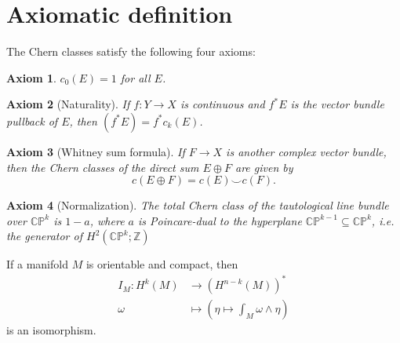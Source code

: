 \documentclass[11pt]{homework}
\theoremstyle{indented}
\newtheorem{axiom}{Axiom}
\begin{document}
\section{Axiomatic definition}
\begin{definition}
    The Chern classes satisfy the following four axioms:
        \begin{axiom} $c_{0}(E)=1$ for all $E$.\end{axiom}

        \begin{axiom}[Naturality] If $f : Y \to X$ is continuous and $f^*E$ is the vector bundle pullback of $E$, then $(f^{*}E)=f^{*}c_{k}(E)$.\end{axiom}

        \begin{axiom}[Whitney sum formula]
            \label{axm:whitney_sum}
            If $F\to X$ is another complex vector bundle, then the Chern classes of the direct sum $E\oplus F$ are given by
            \begin{equation*}
                c(E\oplus F)=c(E)\smile c(F).
            \end{equation*}
        \end{axiom}
        \begin{axiom}[Normalization] The total Chern class of the tautological line bundle over $\mathbb{CP}^k$ is $1-a$, where $a$ is Poincare-dual to the hyperplane $\mathbb{CP}^{k-1}\subseteq \mathbb{CP}^k$, i.e. the generator of $H^2\left(\mathbb{CP}^k; \mathbb{Z}\right)$ \end{axiom}
\end{definition}

\begin{theorem}
    If a manifold $M$ is orientable and compact, then 
    \begin{align*}
        I_M : H^{k}(M) &\to \left(H^{n-k}(M)\right)^\ast \\
        \omega &\mapsto \left( \eta \mapsto \int_M \omega \wedge \eta \right)
    \end{align*}
    is an isomorphism.
\end{theorem}
\end{document}
